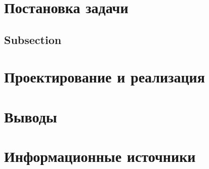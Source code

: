 \documentclass[a4paper]{article}
\author{Буренин А.А}
\begin{document}

    \tableofcontents{}
    \clearpage


    \clearpage\section{Постановка задачи}\label{sec:introduction}
    \subsection*{Subsection}\label{subsec:subsection}


    \clearpage\section{Проектирование и реализация}\label{sec:implementation}


    \clearpage\section{Выводы}\label{sec:conclusion}


    \clearpage\section{Информационные источники}\label{sec:sources}
\end{document}
